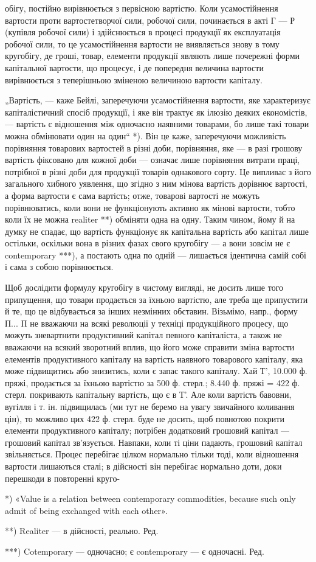 обігу, постійно вирівнюється з первісною вартістю. Коли усамостійнення
вартости проти вартостетворчої сили, робочої сили, починається в акті
Г — Р (купівля робочої сили) і здійснюється в процесі продукції як
експлуатація робочої сили, то це усамостійнення вартости не виявляється
знову в тому кругобігу, де гроші, товар, елементи продукції являють
лише почережні форми капітальної вартости, що процесує, і де попередня
величина вартости вирівнюється з теперішньою зміненою величиною
вартости капіталу.

„Вартість, — каже Бейлі, заперечуючи усамостійнення вартости, яке
характеризує капіталістичний спосіб продукції, і яке він трактує як
ілюзію деяких економістів, — вартість є відношення між одночасно наявними
товарами, бо лише такі товари можна обмінювати один на один“ *).
Він це каже, заперечуючи можливість порівняння товарових вартостей в
різні доби, порівняння, яке — в разі грошову вартість фіксовано для
кожної доби — означає лише порівняння витрати праці, потрібної в різні
доби для продукції товарів однакового сорту. Це випливає з його загального
хибного уявлення, що згідно з ним мінова вартість дорівнює
вартості, а форма вартости є сама вартість; отже, товарові вартості не
можуть порівнюватись, коли вони не функціонують активно як мінові вартости,
тобто коли їх не можна realiter **) обміняти одна на одну. Таким
чином, йому й на думку не спадає, що вартість функціонує як капітальна
вартість або капітал лише остільки, оскільки вона в різних фазах свого
кругобігу — а вони зовсім не є contemporary ***), а постають одна по
одній — лишається ідентична самій собі і сама з собою порівнюється.

Щоб дослідити формулу кругобігу в чистому вигляді, не досить лише
того припущення, що товари продається за їхньою вартістю, але треба
ще припустити й те, що це відбувається за інших незмінних обставин.
Візьмімо, напр., форму П... П не вважаючи на всякі революції у техніці
продукційного процесу, що можуть зневартнити продуктивний капітал певного
капіталіста, а також не вважаючи на всякий зворотний вплив, що
його може справити зміна вартости елементів продуктивного капіталу на
вартість наявного товарового капіталу, яка може підвищитись або
знизитись, коли є запас такого капіталу. Хай Т', 10.000 ф. пряжі,
продається за їхньою вартістю за 500 ф. стерл.; 8.440 ф. пряжі =
422 ф. стерл. покривають капітальну вартість, що є в Т'. Але коли
вартість бавовни, вугілля і т. ін. підвищилась (ми тут не беремо на увагу
звичайного коливання цін), то можливо цих 422 ф. стерл. буде не досить,
щоб повнотою покрити елементи продуктивного капіталу; потрібен додатковий
грошовий капітал — грошовий капітал зв’язується. Навпаки, коли
ті ціни падають, грошовий капітал звільняється. Процес перебігає цілком
нормально тільки тоді, коли відношення вартости лишаються сталі; в дійсності
він перебігає нормально доти, доки перешкоди в повторенні круго-

*) «Value is a relation between contemporary commodities, because such only
admit of being exchanged with each other».

**) Realiter — в дійсності, реально. Ред.

***) Cotemporary — одночасно; є contemporary — є одночасні. Ред.
